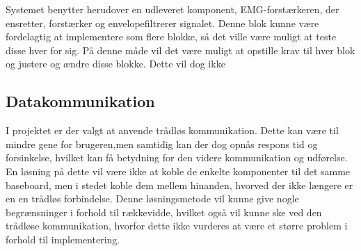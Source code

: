 Systemet benytter herudover en udleveret komponent, EMG-forstærkeren, der ensretter, forstærker og envelopefiltrerer signalet. Denne blok kunne være fordelagtig at implementere som flere blokke, så det ville være muligt at teste disse hver for sig. På denne måde vil det være muligt at opstille krav til hver blok og justere og ændre disse blokke. Dette vil dog ikke %

\subsection{Datakommunikation}
I projektet er der valgt at anvende trådløs kommunikation. Dette kan være til mindre gene for brugeren,men samtidig kan der dog opnås respons tid og forsinkelse, hvilket kan få betydning for den videre kommunikation og udførelse. En løsning på dette vil være ikke at koble de enkelte komponenter til det samme baseboard, men i stedet koble dem mellem hinanden, hvorved der ikke længere er en en trådløs forbindelse. Denne løsningsmetode vil kunne give nogle begrænsninger i forhold til rækkevidde, hvilket også vil kunne ske ved den trådløse kommunikation, hvorfor dette ikke vurderes at være et større problem i forhold til implementering. 





